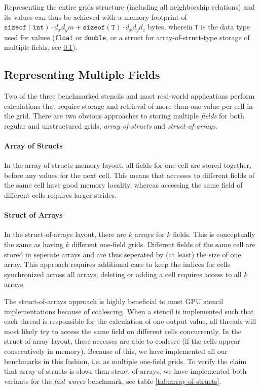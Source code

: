 Representing the entire grids structure (including all neighborship relations) and its values can thus be achieved with a memory footprint of $\mathtt{sizeof(int)} \cdot d_xd_ym + \mathtt{sizeof(T)}\cdot d_xd_yd_z$ bytes, wherein \texttt{T} is the data type used for values (\texttt{float} or \texttt{double}, or a struct for array-of-struct-type storage of multiple fields, see \ref{sec:representing-multiple-fields}).

\subsection{Representing Multiple Fields} \label{sec:representing-multiple-fields}

Two of the three benchmarked stencils and most real-world applications perform calculations that require storage and retrieval of more than one value per cell in the grid. There are two obvious approaches to storing multiple \emph{fields} for both regular and unstructured grids, \emph{array-of-structs} and \emph{struct-of-arrays}.

\paragraph{Array of Structs}
In the array-of-structs memory layout, all fields for one cell are stored together, before any values for the next cell. This means that accesses to different fields of the same cell have good memory locality, whereas accessing the same field of different cells requires larger strides.

\paragraph{Struct of Arrays}
In the struct-of-arrays layout, there are $k$ arrays for $k$ fields. This is conceptually the same as having $k$ different one-field grids. Different fields of the same cell are stored in seperate arrays and are thus seperated by (at least) the size of one array. This approach requires additional care to keep the indices for cells synchronized across all arrays; deleting or adding a cell requires access to all $k$ arrays.

The struct-of-arrays approach is highly beneficial to most GPU stencil implementations because of coalescing. When a stencil is implemented such that each thread is responsible for the calculation of one output value, all threads will most likely try to access the same field on different cells concurrently. In the struct-of-array layout, these accesses are able to coalesce (if the cells appear consecutively in memory).  Because of this, we have implemented all our benchmarks in this fashion, i.e. as multiple one-field grids. To verify the claim that array-of-structs is slowr than struct-of-arrays, we have implemented both variants for the \emph{fast waves} benchmark, see table \ref{tab:array-of-structs}.

